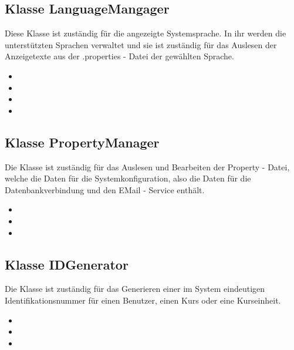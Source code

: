 \documentclass[a4paper]{scrreprt}
\begin{document}
	\subsection{Klasse LanguageMangager}
	Diese Klasse ist zuständig für die angezeigte Systemsprache. In ihr werden die unterstützten Sprachen verwaltet und sie ist zuständig für das Auslesen der Anzeigetexte aus der .properties - Datei der gewählten Sprache.
	\begin{itemize}
		\item {}
		\item {}
		\item {}
		\item {}
	\end{itemize}
	
	\subsection{Klasse PropertyManager}
	Die Klasse ist zuständig für das Auslesen und Bearbeiten der Property - Datei, welche die Daten für die Systemkonfiguration, also die Daten für die Datenbankverbindung und den EMail - Service enthält.
	\begin{itemize}
		\item {}
		\item {}
		\item {}
	\end{itemize}
	
	\subsection{Klasse IDGenerator}
	Die Klasse ist zuständig für das Generieren einer im System eindeutigen Identifikationsnummer für einen Benutzer, einen Kurs oder eine Kurseinheit.
	\begin{itemize}
		\item {}
		\item {}
		\item {}
	\end{itemize}
	
\end{document}
